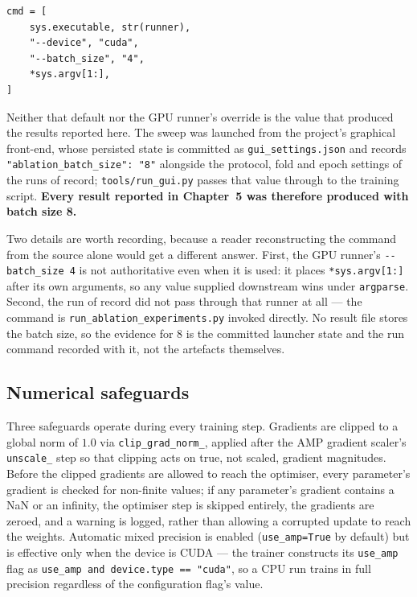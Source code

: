 \begin{verbatim}
cmd = [
    sys.executable, str(runner),
    "--device", "cuda",
    "--batch_size", "4",
    *sys.argv[1:],
]
\end{verbatim}

Neither that default nor the GPU runner's override is the value that produced the results reported here. The sweep was launched from the project's graphical front-end, whose persisted state is committed as \texttt{gui\_settings.json} and records \texttt{"ablation\_batch\_size": "8"} alongside the protocol, fold and epoch settings of the runs of record; \texttt{tools/run\_gui.py} passes that value through to the training script. \textbf{Every result reported in Chapter~5 was therefore produced with batch size 8.}

Two details are worth recording, because a reader reconstructing the command from the source alone would get a different answer. First, the GPU runner's \texttt{-{}-batch\_size 4} is not authoritative even when it is used: it places \verb|*sys.argv[1:]| after its own arguments, so any value supplied downstream wins under \texttt{argparse}. Second, the run of record did not pass through that runner at all --- the command is \texttt{run\_ablation\_experiments.py} invoked directly. No result file stores the batch size, so the evidence for 8 is the committed launcher state and the run command recorded with it, not the artefacts themselves.

\subsection{Numerical safeguards}
\label{sec:numerical-safeguards}

Three safeguards operate during every training step. Gradients are clipped to a global norm of $1.0$ via \texttt{clip\_grad\_norm\_}, applied after the AMP gradient scaler's \texttt{unscale\_} step so that clipping acts on true, not scaled, gradient magnitudes. Before the clipped gradients are allowed to reach the optimiser, every parameter's gradient is checked for non-finite values; if any parameter's gradient contains a NaN or an infinity, the optimiser step is skipped entirely, the gradients are zeroed, and a warning is logged, rather than allowing a corrupted update to reach the weights. Automatic mixed precision is enabled (\texttt{use\_amp=True} by default) but is effective only when the device is CUDA --- the trainer constructs its \texttt{use\_amp} flag as \verb|use_amp and device.type == "cuda"|, so a CPU run trains in full precision regardless of the configuration flag's value.

